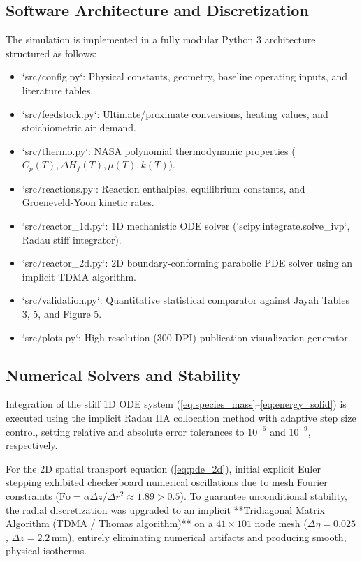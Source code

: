 \documentclass[11pt,a4paper]{article}
\begin{document}
\subsection{Software Architecture and Discretization}
The simulation is implemented in a fully modular Python 3 architecture structured as follows:
\begin{itemize}[leftmargin=1.5em]
    \item `src/config.py`: Physical constants, geometry, baseline operating inputs, and literature tables.
    \item `src/feedstock.py`: Ultimate/proximate conversions, heating values, and stoichiometric air demand.
    \item `src/thermo.py`: NASA polynomial thermodynamic properties ($C_p(T), \Delta H_f(T), \mu(T), k(T)$).
    \item `src/reactions.py`: Reaction enthalpies, equilibrium constants, and Groeneveld-Yoon kinetic rates.
    \item `src/reactor_1d.py`: 1D mechanistic ODE solver (`scipy.integrate.solve_ivp`, Radau stiff integrator).
    \item `src/reactor_2d.py`: 2D boundary-conforming parabolic PDE solver using an implicit TDMA algorithm.
    \item `src/validation.py`: Quantitative statistical comparator against Jayah Tables 3, 5, and Figure 5.
    \item `src/plots.py`: High-resolution (300 DPI) publication visualization generator.
\end{itemize}

\subsection{Numerical Solvers and Stability}
Integration of the stiff 1D ODE system (\ref{eq:species_mass}--\ref{eq:energy_solid}) is executed using the implicit Radau IIA collocation method with adaptive step size control, setting relative and absolute error tolerances to $10^{-6}$ and $10^{-9}$, respectively. 

For the 2D spatial transport equation (\ref{eq:pde_2d}), initial explicit Euler stepping exhibited checkerboard numerical oscillations due to mesh Fourier constraints ($\text{Fo} = \alpha \Delta z / \Delta r^2 \approx 1.89 > 0.5$). To guarantee unconditional stability, the radial discretization was upgraded to an implicit **Tridiagonal Matrix Algorithm (TDMA / Thomas algorithm)** on a $41 \times 101$ node mesh ($\Delta \eta = 0.025$, $\Delta z = 2.2$\,mm), entirely eliminating numerical artifacts and producing smooth, physical isotherms.
\end{document}
